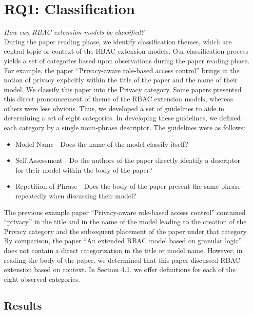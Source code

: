 \section{RQ1: Classification} \label{sec:categorization}

\textit{How can RBAC extension models be classified?}
\\

During the paper reading phase, we identify classification themes, which are central topic or context of the RBAC extension models. 
Our classification process yields a set of categories based upon observations during the paper reading phase.
For example, the paper ``Privacy-aware role-based access control'' \cite{ni2010privacy} brings in the notion of privacy explicitly within the title of the paper and the name of their model. 
We classify this paper into the Privacy category. 
Some papers presented this direct pronouncement of theme of the RBAC extension models, whereas others were less obvious.
Thus, we developed a set of guidelines to aide in determining a set of eight categories. 
In developing these guidelines, we defined each category by a single noun-phrase descriptor.
The guidelines were as follows:

\begin{itemize}
\item Model Name - Does the name of the model classify itself?
\item Self Assessment - Do the authors of the paper directly identify a descriptor for their model within the body of the paper?
\item Repetition of Phrase - Does the body of the paper present the same phrase repeatedly when discussing their model?
\end{itemize}

The previous example paper ``Privacy-aware role-based access control'' \cite{ni2010privacy} contained ``privacy'' in the title and in the name of the model leading to the creation of the Privacy category and the subsequent placement of the paper under that category.
By comparison, the paper ``An extended RBAC model based on granular logic'' \cite{jian2008extended} does not contain a direct categorization in the title or model name. 
However, in reading the body of the paper, we determined that this paper discussed RBAC extension based on context. 
In Section 4.1, we offer definitions for each of the eight observed categories.

\subsection{Results}

